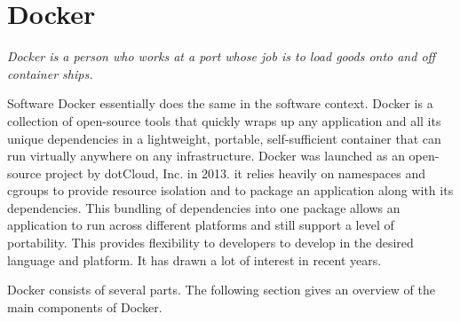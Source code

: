 	\section{Docker}
	\label{Grundlagen:Docker}
	\textit{Docker is a person who works at a port whose job is to load goods onto and off container ships.} \cite{docker-definition-english}

	Software Docker essentially does the same in the software context. Docker is a collection of open-source tools that quickly wraps up any application and all its unique dependencies in a lightweight, portable, self-sufficient container that can run virtually anywhere on any infrastructure.\cite{docker-definition}
	Docker was launched as an open-source project by dotCloud, Inc. in
	2013. it relies heavily on namespaces and cgroups to provide resource isolation and to package an application along with its dependencies. This bundling of dependencies into one package allows an application to run across different platforms and still support a level of portability. This provides flexibility to developers to develop in the desired language and platform. It has drawn a lot of interest in recent years.\cite[P.~10]{Kinnary2018}

	Docker consists of several parts. The following section gives an overview of the main components of Docker.



